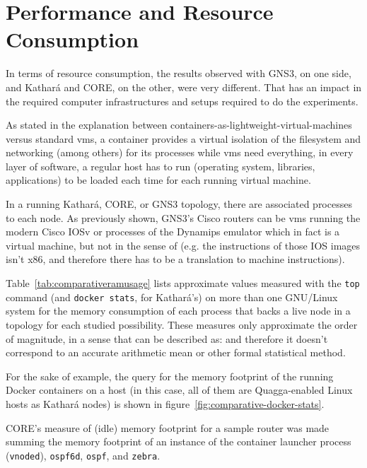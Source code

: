 \section{Performance and Resource Consumption}
\label{sec:comparativeperformance}

In terms of resource consumption, the results observed with GNS3, on one side, and Kathará and CORE, on the other, were very different.
That has an impact in the required computer infrastructures and setups required to do the experiments.

As stated in the explanation between containers-as-lightweight-virtual-machines versus standard \glspl{vm}, a container provides a virtual isolation of the filesystem and networking (among others) for its processes while \glspl{vm} need everything, in every layer of software, a regular host has to run (operating system, libraries, applications) to be loaded each time for each running virtual machine.

In a running Kathará, CORE, or GNS3 topology, there are associated processes to each node.
As previously shown, GNS3's Cisco routers can be \glspl{vm} running the modern Cisco IOSv or processes of the Dynamips emulator which in fact is a virtual machine, but not in the sense of  (e.g. the instructions of those IOS images isn't x86, and therefore there has to be a translation to machine instructions).

Table~\ref{tab:comparativeramusage} lists approximate values measured with the \texttt{top} command (and \texttt{docker~stats}, for Kathará's) on more than one GNU/Linux system for the memory consumption of each process that backs a live node in a topology for each studied possibility.
These measures only approximate the order of magnitude, in a sense that can be described as:  and therefore it doesn't correspond to an accurate arithmetic mean or other formal statistical method.



For the sake of example, the query for the memory footprint of the running Docker containers on a host (in this case, all of them are Quagga-enabled Linux hosts as Kathará nodes) is shown in figure~\ref{fig:comparative-docker-stats}.

CORE's measure of (idle) memory footprint for a sample router was made summing the memory footprint of an instance of the container launcher process (\texttt{vnoded}), \texttt{ospf6d}, \texttt{ospf}, and \texttt{zebra}.



